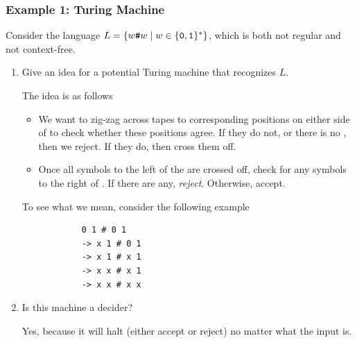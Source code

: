 \documentclass[letterpaper]{article}
\begin{document}
\subsubsection{Example 1: Turing Machine}
Consider the language $L = \{w\texttt{\#}w \mid w \in \{\texttt{0}, \texttt{1}\}^*\}$, which is both not regular and not context-free. 

\begin{enumerate}
    \item Give an idea for a potential Turing machine that recognizes $L$.

    \begin{mdframed}[]
        The idea is as follows
        \begin{itemize}
            \item We want to zig-zag across tapes to corresponding positions on either side of \code{\#} to check whether these positions agree. If they do not, or there is no \code{\#}, then we reject. If they do, then cross them off. 
            \item Once all symbols to the left of the \code{\#} are crossed off, check for any symbols to the right of \code{\#}. If there are any, \emph{reject}. Otherwise, accept.
        \end{itemize}
        To see what we mean, consider the following example  
        \begin{verbatim}
            0 1 # 0 1
            -> x 1 # 0 1
            -> x 1 # x 1 
            -> x x # x 1 
            -> x x # x x
        \end{verbatim}
    \end{mdframed}

    \item Is this machine a decider? 
    \begin{mdframed}[]
        Yes, because it will halt (either accept or reject) no matter what the input is. 
    \end{mdframed}


\end{enumerate}
\end{document}
